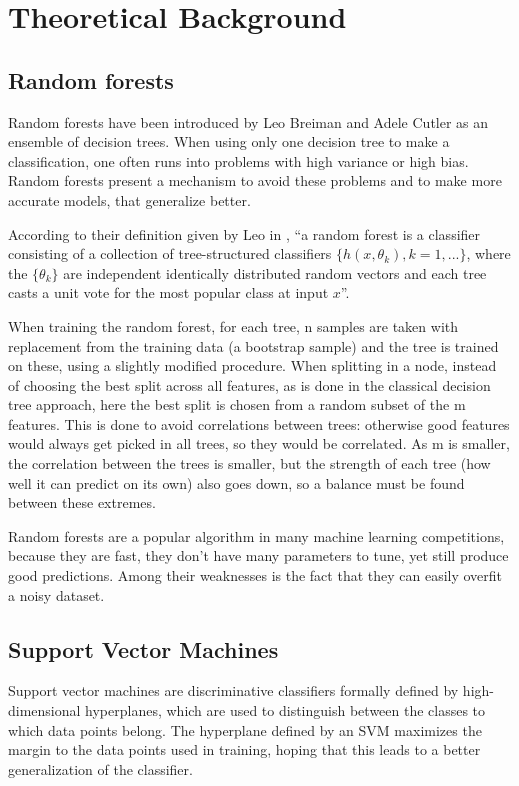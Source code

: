 \section{Theoretical Background}

\subsection{Random forests}

Random forests have been introduced by Leo Breiman and Adele Cutler \cite{breiman2001random} as an ensemble of decision trees. When using only one decision tree to make a classification, one often runs into problems with high variance or high bias. Random forests present a mechanism to avoid these problems and to make more accurate models, that generalize better. 

According to their definition given by Leo in \cite{breiman2001random}, ``a random forest is a classifier consisting of a collection of tree-structured classifiers $ \{h(x, \theta_k), k=1, ... \} $, where the $ \{ \theta_k \} $ are independent identically distributed random vectors and each tree casts a unit vote for the most popular class at input $ x $''.


When training the random forest, for each tree, n samples are taken with replacement from the training data (a bootstrap sample) and the tree is trained on these, using a slightly modified procedure. When splitting in a node, instead of choosing the best split across all features, as is done in the classical decision tree approach, here the best split is chosen from a random subset of the m features. This is done to avoid correlations between trees: otherwise good features would always get picked in all trees, so they would be correlated. As m is smaller, the correlation between the trees is smaller, but the strength of each tree (how well it can predict on its own) also goes down, so a balance must be found between these extremes. 

Random forests are a popular algorithm in many machine learning competitions, because they are fast, they don't have many parameters to tune, yet still produce good predictions. Among their weaknesses is the fact that they can easily overfit a noisy dataset. 

\subsection{Support Vector Machines}

Support vector machines \cite{Cortes_1995} are discriminative classifiers formally defined by high-dimensional hyperplanes, which are used to distinguish between the classes to which data points belong. The hyperplane defined by an SVM maximizes the margin to the data points used in training, hoping that this leads to a better generalization of the classifier. 

